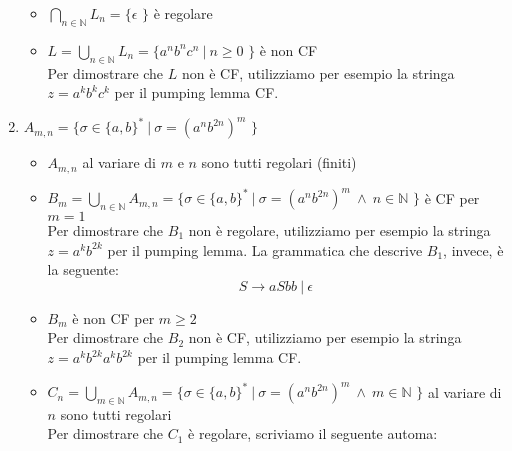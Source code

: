 \documentclass[a4paper,oneside,titlepage]{book}
\begin{document}
\begin{enumerate}[label=\fbox{\arabic*}]
\begin{itemize}
\item $\bigcap_{n \in \mathbb{N}} L_n = \text{\{ } \epsilon \text{ \}}$ è regolare

\item $L = \bigcup_{n \in \mathbb{N}} L_n = \text{\{ } a^n b^n c^n \ | \  n \geq 0 \text{ \}}$ è non CF
\\ Per dimostrare che $L$ non è CF, utilizziamo per esempio la stringa $z = a^k b^k c^k$ per il pumping lemma CF.
\end{itemize}

\item $A_{m,n} = \text{\{ } \sigma \in \{a,b\}^* \ | \ \sigma = (a^n b^{2n})^m \text{ \}}$
\begin{itemize}
\item $A_{m,n}$ al variare di $m$ e $n$ sono tutti regolari (finiti)

\item $B_m = \bigcup_{n \in \mathbb{N}} A_{m,n} = \text{\{ } \sigma \in \{a,b\}^* \ | \ \sigma = (a^n b^{2n})^m \ \wedge \ n \in \mathbb{N} \text{ \}}$ è CF per $m=1$
\\ Per dimostrare che $B_1$ non è regolare, utilizziamo per esempio la stringa $z = a^k b^{2k}$ per il pumping lemma. La grammatica che descrive $B_1$, invece, è la seguente:
\[ S \longrightarrow aSbb \ | \ \epsilon \]

\item $B_m$ è non CF per $m \geq 2$
\\ Per dimostrare che $B_2$ non è CF, utilizziamo per esempio la stringa $z = a^k b^{2k} a^k b^{2k}$ per il pumping lemma CF.

\item $C_n = \bigcup_{m \in \mathbb{N}} A_{m,n} = \text{\{ } \sigma \in \{a,b\}^* \ | \ \sigma = (a^n b^{2n})^m \ \wedge \ m \in \mathbb{N} \text{ \}}$ al variare di $n$ sono tutti regolari
\\ Per dimostrare che $C_1$ è regolare, scriviamo il seguente automa:
\begin{center}
\end{center}
\end{itemize}
\end{enumerate}
\end{document}
